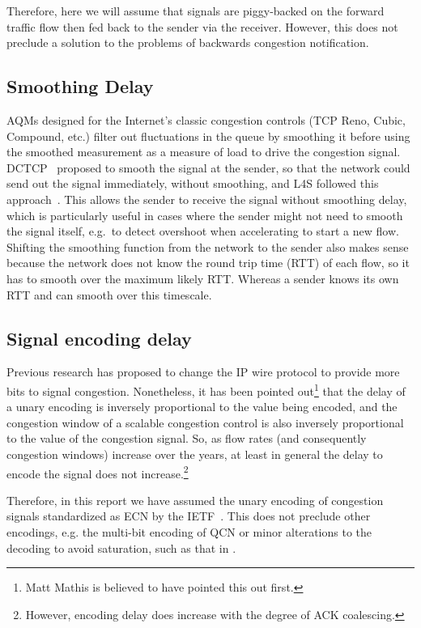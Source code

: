 Therefore, here we will assume that signals are piggy-backed on the forward traffic flow then fed back to the sender via the receiver. However, this does not preclude a solution to the problems of backwards congestion notification.

\subsection{Smoothing Delay} AQMs designed for the Internet's classic congestion controls (TCP Reno, Cubic, Compound, etc.) filter out fluctuations in the queue by smoothing it before using the smoothed measurement as a measure of load to drive the congestion signal. DCTCP~\cite{Alizadeh10:DCTCP} proposed to smooth the signal at the sender, so that the network could send out the signal immediately, without smoothing, and L4S followed this approach~\cite{Briscoe16a:l4s-arch_ID}. This allows the sender to receive the signal without smoothing delay, which is particularly useful in cases where the sender might not need to smooth the signal itself, e.g.\ to detect overshoot when accelerating to start a new flow. Shifting the smoothing function from the network to the sender also makes sense because the network does not know the round trip time (RTT) of each flow, so it has to smooth over the maximum likely RTT. Whereas a sender knows its own RTT and can smooth over this timescale.

\subsection{Signal encoding delay} Previous research has proposed to change the IP wire protocol to provide more bits to signal congestion. Nonetheless, it has been pointed out\footnote{Matt Mathis is believed to have pointed this out first.} that the delay of a unary encoding is inversely proportional to the value being encoded, and the congestion window of a scalable congestion control is also inversely proportional to the value of the congestion signal. So, as flow rates (and consequently congestion windows) increase over the years, at least in general the delay to encode the signal does not increase.\footnote{However, encoding delay does increase with the degree of ACK coalescing.}

Therefore, in this report we have assumed the unary encoding of congestion signals standardized as ECN by the IETF~\cite{IETF_RFC3168:ECN_IP_TCP}. This does not preclude other encodings, e.g. the multi-bit encoding of QCN or minor alterations to the decoding to avoid saturation, such as that in \cite{Briscoe17a:CC_Tensions_TR}.

